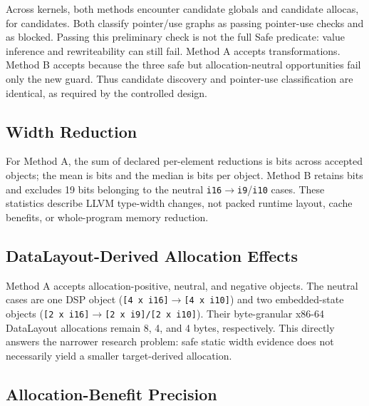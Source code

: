\documentclass[11pt,twocolumn]{article}
\begin{document}
Across \BenchmarkCount{} kernels, both methods encounter \CandidateGlobals{}
candidate globals and \CandidateAllocas{} candidate allocas, for
\CandidateTotal{} candidates. Both classify \SafeCandidates{} pointer/use
graphs as passing pointer-use checks and \BlockedCandidates{} as blocked.
Passing this preliminary check is not the full \textsf{Safe} predicate:
value inference and rewriteability can still fail. Method A accepts
\ATransformed{} transformations. Method B accepts \BTransformed{} because the
three safe but allocation-neutral opportunities fail only the new guard. Thus
candidate discovery and pointer-use classification are identical, as required by
the controlled design.

\subsection{Width Reduction}

For Method A, the sum of declared per-element reductions is
\ADeclaredBits{} bits across accepted objects; the mean is
\StaticReductionMean{} bits and the median is \StaticReductionMedian{} bits per
object. Method B retains \BDeclaredBits{} bits and excludes 19 bits belonging to
the neutral \texttt{i16}$\rightarrow$\texttt{i9}/\texttt{i10} cases. These
statistics describe LLVM type-width changes, not packed runtime layout, cache
benefits, or whole-program memory reduction.






\subsection{DataLayout-Derived Allocation Effects}

Method A accepts \APositive{} allocation-positive, \AZero{} neutral, and
\ANegative{} negative objects. The neutral cases are one DSP object
(\texttt{[4 x i16]}$\rightarrow$\texttt{[4 x i10]}) and two embedded-state
objects (\texttt{[2 x i16]}$\rightarrow$\texttt{[2 x i9]/[2 x i10]}). Their
byte-granular x86-64 DataLayout allocations remain 8, 4, and 4 bytes,
respectively. This directly answers the narrower research problem: safe static
width evidence does not necessarily yield a smaller target-derived allocation.

\subsection{Allocation-Benefit Precision}
\end{document}

